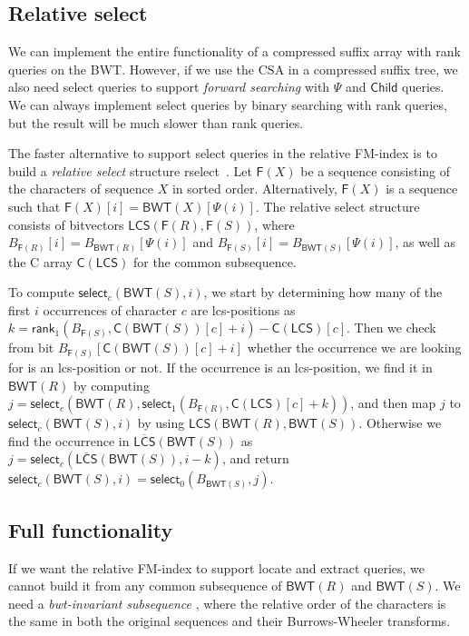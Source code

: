\documentclass[a4paper,11pt]{llncs}
\renewcommand{\complement}[1]{\ensuremath{\overline{ #1 }}}
\newcommand{\BWT}{\textsf{BWT}}
\newcommand{\CSA}{\textsf{CSA}}
\newcommand{\mBWT}{\ensuremath{\mathsf{BWT}}}
\newcommand{\mF}{\ensuremath{\mathsf{F}}}
\newcommand{\C}{\textsf{C}}
\newcommand{\mC}{\ensuremath{\mathsf{C}}}
\newcommand{\mLCS}{\ensuremath{\mathsf{LCS}}}
\newcommand{\mCS}{\ensuremath{\complement{\mathsf{LCS}}}}
\newcommand{\rselect}{\textsf{rselect}}
\newcommand{\locate}{\textsf{locate}}
\newcommand{\extract}{\textsf{extract}}
\newcommand{\rank}{\textsf{rank}}
\newcommand{\select}{\textsf{select}}
\newcommand{\mPsi}{\ensuremath{\mathsf{\Psi}}}
\newcommand{\mrank}{\ensuremath{\mathsf{rank}}}
\newcommand{\mselect}{\ensuremath{\mathsf{select}}}
\newcommand{\mChild}{\ensuremath{\mathsf{Child}}}
\begin{document}
\subsection{Relative select}

We can implement the entire functionality of a compressed suffix array with \rank{} queries on the \BWT. However, if we use the \CSA{} in a compressed suffix tree, we also need \select{} queries to support \emph{forward searching} with $\mPsi$ and $\mChild$ queries. We can always implement \select{} queries by binary searching with \rank{} queries, but the result will be much slower than \rank{} queries.

The faster alternative to support \select{} queries in the relative FM-index is to build a \emph{relative select} structure \rselect{}~\cite{Boucher2015}. Let $\mF(X)$ be a sequence consisting of the characters of sequence $X$ in sorted order. Alternatively, $\mF(X)$ is a sequence such that $\mF(X)[i] = \mBWT(X)[\mPsi(i)]$. The relative select structure consists of bitvectors $\mLCS(\mF(R), \mF(S))$, where $B_{\mF(R)}[i] = B_{\mBWT(R)}[\mPsi(i)]$ and $B_{\mF(S)}[i] = B_{\mBWT(S)}[\mPsi(i)]$, as well as the \C{} array $\mC(\mLCS)$ for the common subsequence.

To compute $\mselect_{c}(\mBWT(S), i)$, we start by determining how many of the first $i$ occurrences of character $c$ are lcs-positions as $k = \mrank_{1}(B_{\mF(S)}, \mC(\mBWT(S))[c] + i) - \mC(\mLCS)[c]$. Then we check from bit $B_{\mF(S)}[\mC(\mBWT(S))[c] + i]$ whether the occurrence we are looking for is an lcs-position or not. If the occurrence is an lcs-position, we find it in $\mBWT(R)$ by computing $j = \mselect_{c}(\mBWT(R), \mselect_{1}(B_{\mF(R)}, \mC(\mLCS)[c] + k))$, and then map $j$ to $\mselect_{c}(\mBWT(S), i)$ by using $\mLCS(\mBWT(R), \mBWT(S))$. Otherwise we find the occurrence in $\mCS(\mBWT(S))$ as $j = \mselect_{c}(\mCS(\mBWT(S)), i-k)$, and return $\mselect_{c}(\mBWT(S), i) = \mselect_{0}(B_{\mBWT(S)}, j)$.

\subsection{Full functionality}

If we want the relative FM-index to support \locate{} and \extract{} queries, we cannot build it from any common subsequence of $\mBWT(R)$ and $\mBWT(S)$. We need a \emph{bwt-invariant subsequence} \cite{Belazzougui2014}, where the relative order of the characters is the same in both the original sequences and their Burrows-Wheeler transforms.
\end{document}
